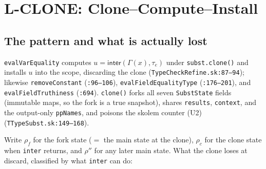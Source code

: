 \documentclass[11pt]{article}
\newcommand{\Env}{\Gamma}
\begin{document}
\section{L-CLONE: Clone--Compute--Install}
\label{sec:lclone}

\subsection{The pattern and what is actually lost}

\texttt{evalVarEquality} computes
$u = \mathsf{inter}(\Env(x), \tau_e)$ under \texttt{subst.clone()} and
installs $u$ into the scope, discarding the clone
(\texttt{TypeCheckRefine.sk:87--94}); likewise \texttt{removeConstant}
(\texttt{:96--106}), \texttt{evalFieldEqualityType}
(\texttt{:176--201}), and \texttt{evalFieldTruthiness}
(\texttt{:694}). \texttt{clone()} forks all seven
\texttt{SubstState} fields (immutable maps, so the fork is a true
snapshot), shares \texttt{results}, \texttt{context}, and the
output-only \texttt{ppNames}, and poisons the skolem counter (U2)
(\texttt{TTypeSubst.sk:149--168}).

Write $\rho_f$ for the fork state ($=$ the main state at the clone),
$\rho_c$ for the clone state when \texttt{inter} returns, and $\rho''$
for any later main state. What the clone loses at discard, classified by
what \texttt{inter} can do:
\end{document}
